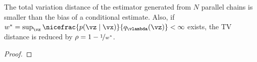 
\begin{proposition}\label{thm:bias_bound}
  The total variation distance of the estimator generated from \(N\) parallel chains is smaller than the bias of a conditional estimate.
  Also, if \(w^* = \sup_{\vz} \nicefrac{p(\vz\mid\vx)}{q_{\vlambda}(\vz)} < \infty \) exists, the TV distance is reduced by \(\rho = 1 - \nicefrac{1}{w^*}\).
\end{proposition}
\begin{proof}
  
\end{proof}


